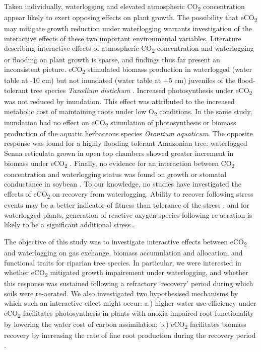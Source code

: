 \documentclass[12pt,a4paper]{memoir}
\begin{document}
Taken individually, waterlogging and elevated atmospheric CO\textsubscript{2} concentration appear likely to exert opposing effects on plant growth. The possibility that eCO\textsubscript{2} may mitigate growth reduction under waterlogging warrants investigation of the interactive effects of these two important environmental variables. Literature describing interactive effects of atmospheric CO\textsubscript{2} concentration and waterlogging or flooding on plant growth is sparse, and findings thus far present an inconsistent picture. eCO\textsubscript{2} stimulated biomass production in waterlogged (water table at -10 cm) but not inundated (water table at +5 cm) juveniles of the flood-tolerant tree species \textit{Taxodium distichum} \citep{Megonigal2005}. Increased photosynthesis under eCO\textsubscript{2} was not reduced by inundation. This effect was attributed to the increased metabolic cost of maintaining roots under low O\textsubscript{2} conditions. In the same study, inundation had no effect on eCO\textsubscript{2} stimulation of photosynthesis or biomass production of the aquatic herbaceous species \textit{Orontium aquaticum}.  The opposite response was found for a highly flooding tolerant Amazonian tree: waterlogged Senna reticulata grown in open top chambers showed greater increment in biomass under eCO\textsubscript{2} \citep{Arenque2014}. Finally, no evidence for an interaction between CO\textsubscript{2} concentration and waterlogging status was found on growth or stomatal conductance in soybean \citep{Shimono2012}. To our knowledge, no studies have investigated the effects of eCO\textsubscript{2} on recovery from waterlogging. Ability to recover following stress events may be a better indicator of fitness than tolerance of the stress \citep{Gutschick2003}, and for waterlogged plants, generation of reactive oxygen species following re-aeration is likely to be a significant additional stress \citep{Drew1997}. 

The objective of this study was to investigate interactive effects between eCO\textsubscript{2} and waterlogging on gas exchange, biomass accumulation and allocation, and functional traits for riparian tree species. In particular, we were interested in whether eCO\textsubscript{2} mitigated growth impairement under waterlogging, and whether this response was sustained following a refractory ‘recovery’ period during which soils were re-aerated. We also investigated two hypothesised mechanisms by which such an interactive effect might occur: a.) higher water use efficiency under eCO\textsubscript{2} \citep{Holtum2010} facilitates photosynthesis in plants with anoxia-impaired root functionality by lowering the water cost of carbon assimilation; b.) eCO\textsubscript{2} facilitates biomass recovery by increasing the rate of fine root production during the recovery period \citep{Pregitzer1995}.  
\end{document}
